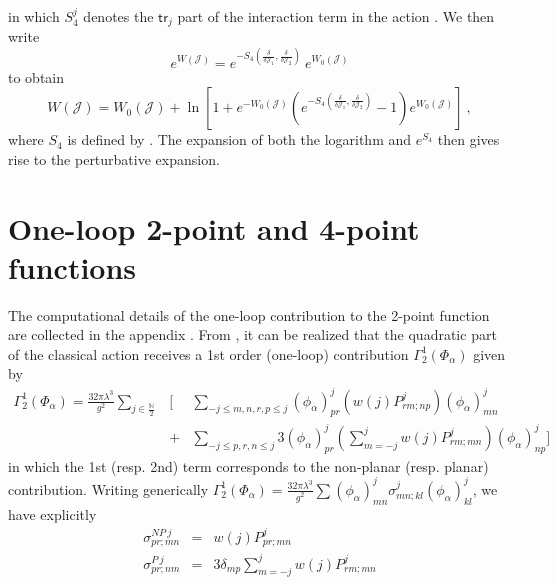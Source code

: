 \documentclass[10pt]{book}
\newcommand{\tr}{\mathsf{tr}}
\theoremstyle{break}
\begin{document}
in which $S^j_4$ denotes the $\tr_j$ part of the interaction term in the action %
. We then write 
\begin{equation*}
e^{W(\mathcal{J})} = e^{-S_4(\frac{\delta}{\delta\mathcal{J}_1},\frac{\delta}{\delta\mathcal{J}_2})}\ e^{W_0(\mathcal{J})}
\end{equation*}
%
to obtain%
%
\begin{equation}
W(\mathcal{J}) = W_0(\mathcal{J}) + \ln\left[ 1 + e^{-W_0(\mathcal{J})}
\left( e^{-S_4(\frac{\delta}{\delta\mathcal{J}_1},\frac{\delta}{\delta\mathcal{J}_2})} - 1 \right) e^{W_0(\mathcal{J})}\right] \ , %
\end{equation}
%
where $S_4$ is defined by %
. The expansion of both the logarithm and $e^{S_4}$ then gives rise to the perturbative expansion. \par 


\section{One-loop 2-point and 4-point functions}





The computational details of the one-loop contribution to the 2-point function are collected in the appendix %
. From %
, it can be realized that the quadratic part of the classical action receives a 1st order (one-loop) contribution $\Gamma^1_2(\Phi_\alpha)$ given by
\begin{eqnarray}
\Gamma^1_2(\Phi_\alpha)=\frac{32\pi\lambda^3}{g^2}\sum_{j\in\frac{\mathbb{N}}{2}}&\Bigg[&\sum_{-j\le m,n,r,p\le j}(\phi_\alpha)^j_{pr}\left(w(j)P^j_{rm;np}\right)(\phi_\alpha)^j_{mn}\nonumber\\
&+&\sum_{-j\le p,r,n\le j}3(\phi_\alpha)^j_{pr}\left(\sum_{m=-j}^jw(j)P^j_{rm;mn}\right)(\phi_\alpha)^j_{np} \Bigg]%
\end{eqnarray}
in which the 1st (resp. 2nd) term corresponds to the non-planar (resp. planar) contribution. Writing generically $\Gamma^1_2(\Phi_\alpha)=\frac{32\pi\lambda^3}{g^2}\sum(\phi_\alpha)^j_{mn}\sigma^j_{mn;kl}(\phi_\alpha)^j_{kl}$, we have explicitly
\begin{eqnarray}
\sigma^{NP\ j}_{pr;mn}&=& w(j)P^j_{pr;mn}%
\\
\sigma^{P\ j}_{pr;nm}&=&3\delta_{mp}\sum_{m=-j}^jw(j)P^j_{rm;mn}%
\end{eqnarray}
\end{document}
